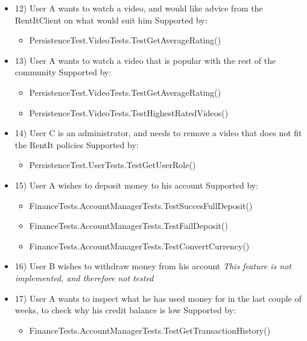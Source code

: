 \begin{itemize}
\item 12) 
User A wants to watch a video, and would like advice from the RentItClient on what would suit him
\newline Supported by:
\begin{itemize}
\item PersistenceTest.VideoTests.TestGetAverageRating()
\end{itemize}

\item 13) 
User A wants to watch a video that is popular with the rest of the community
\newline Supported by:
\begin{itemize}
\item PersistenceTest.VideoTests.TestGetAverageRating()
\item PersistenceTest.VideoTests.TestHighestRatedVideos()
\end{itemize}

\item 14)
User C is an administrator, and needs to remove a video that does not fit the RentIt policies
\newline Supported by:
\begin{itemize}
\item PersistenceTest.UserTests.TestGetUserRole()
\end{itemize}

\item 15)
User A wishes to deposit money to his account
\newline Supported by:
\begin{itemize}
\item FinanceTests.AccountManagerTests.TestSuccesFullDeposit()
\item FinanceTests.AccountManagerTests.TestFailDeposit()
\item FinanceTests.AccountManagerTests.TestConvertCurrency()
\end{itemize}

\item 16)
User B wishes to withdraw money from his account
\newline \textit{This feature is not implemented, and therefore not tested}

\item 17)
User A wants to inspect what he has used money for in the last couple of weeks, to check why his credit balance is low
\newline Supported by:
\begin{itemize}
\item FinanceTests.AccountManagerTests.TestGetTransactionHistory()
\end{itemize}


\end{itemize}
